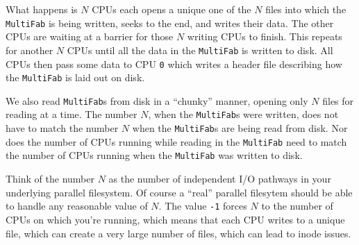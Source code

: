 What happens is $N$ CPUs each opens a unique one of the $N$ files into
which the {\tt MultiFab} is being written, seeks to the end, and writes
their data.  The other CPUs are waiting at a barrier for those $N$
writing CPUs to finish.  This repeats for another $N$ CPUs until all the
data in the {\tt MultiFab} is written to disk.  All CPUs then pass some data
to CPU {\tt 0} which writes a header file describing how the {\tt MultiFab} is
laid out on disk.

We also read {\tt MultiFab}s from disk in a ``chunky'' manner, opening only $N$
files for reading at a time.  The number $N$, when the {\tt MultiFab}s were
written, does not have to match the number $N$ when the {\tt MultiFab}s are
being read from disk.  Nor does the number of CPUs running while
reading in the {\tt MultiFab} need to match the number of CPUs running when
the {\tt MultiFab} was written to disk.

Think of the number $N$ as the number of independent I/O pathways in
your underlying parallel filesystem.  Of course a ``real'' parallel
filesytem should be able to handle any reasonable value of $N$.  The
value {\tt -1} forces $N$ to the number of CPUs on which you're
running, which means that each CPU writes to a unique file, which can
create a very large number of files, which can lead to inode issues.

